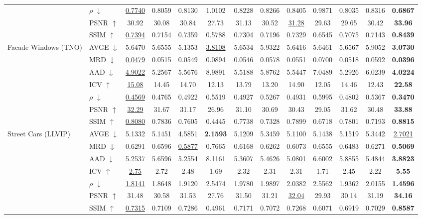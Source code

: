 \begin{table}[t]
{\begin{tabular}{llccccccccccc}
 & $\rho$ $\downarrow$ & \underline{0.7740} & 0.8059 & 0.8130 & 1.0102 & 0.8228 & 0.8266 & 0.8405 & 0.9871 & 0.8035 & 0.8316 & \textbf{0.6867} \\
 & PSNR $\uparrow$ & 30.92 & 30.08 & 30.84 & 27.73 & 31.13 & 30.52 & \underline{31.28} & 29.63 & 29.65 & 30.42 & \textbf{33.96} \\
 & SSIM $\uparrow$ & \underline{0.7394} & 0.7154 & 0.7359 & 0.5788 & 0.7304 & 0.7196 & 0.7329 & 0.6545 & 0.7075 & 0.7143 & \textbf{0.8439} \\
\midrule
\multirow{7}{*}{Facade Windows (TNO)} & AVGE $\downarrow$ & 5.6470 & 5.6555 & 5.1353 & \underline{3.8108} & 5.6534 & 5.9322 & 5.6416 & 5.6461 & 5.6567 & 5.9052 & \textbf{3.0730} \\
 & MRD $\downarrow$ & \underline{0.0479} & 0.0515 & 0.0549 & 0.0894 & 0.0546 & 0.0578 & 0.0551 & 0.0700 & 0.0518 & 0.0592 & \textbf{0.0396} \\
 & AAD $\downarrow$ & \underline{4.9022} & 5.2567 & 5.5676 & 8.9891 & 5.5188 & 5.8762 & 5.5447 & 7.0489 & 5.2926 & 6.0239 & \textbf{4.0224} \\
 & ICV $\uparrow$ & \underline{15.08} & 14.45 & 14.70 & 12.13 & 13.79 & 13.20 & 14.90 & 12.05 & 14.46 & 12.43 & \textbf{22.58} \\
 & $\rho$ $\downarrow$ & \underline{0.4569} & 0.4765 & 0.4922 & 0.5519 & 0.4927 & 0.5267 & 0.4931 & 0.5995 & 0.4802 & 0.5367 & \textbf{0.3470} \\
 & PSNR $\uparrow$ & \underline{32.29} & 31.67 & 31.17 & 26.96 & 31.10 & 30.69 & 30.43 & 29.05 & 31.62 & 30.48 & \textbf{33.88} \\
 & SSIM $\uparrow$ & \underline{0.8080} & 0.7836 & 0.7605 & 0.4445 & 0.7738 & 0.7328 & 0.7899 & 0.6718 & 0.7801 & 0.7193 & \textbf{0.8815} \\
\midrule
\multirow{7}{*}{Street Cars (LLVIP)} & AVGE $\downarrow$ & 5.1332 & 5.1451 & 4.5851 & \textbf{2.1593} & 5.1209 & 5.3459 & 5.1100 & 5.1438 & 5.1519 & 5.3442 & \underline{2.7021} \\
 & MRD $\downarrow$ & 0.6291 & 0.6596 & \underline{0.5877} & 0.7665 & 0.6168 & 0.6262 & 0.6073 & 0.6555 & 0.6483 & 0.6271 & \textbf{0.5069} \\
 & AAD $\downarrow$ & 5.2537 & 5.6596 & 5.2554 & 8.1161 & 5.3607 & 5.4626 & \underline{5.0801} & 6.6002 & 5.8855 & 5.4844 & \textbf{3.8823} \\
 & ICV $\uparrow$ & \underline{2.75} & 2.72 & 2.48 & 1.69 & 2.32 & 2.31 & 2.31 & 1.71 & 2.45 & 2.22 & \textbf{5.55} \\
 & $\rho$ $\downarrow$ & \underline{1.8141} & 1.8648 & 1.9120 & 2.5474 & 1.9780 & 1.9897 & 2.0382 & 2.5562 & 1.9362 & 2.0155 & \textbf{1.4596} \\
 & PSNR $\uparrow$ & 31.48 & 30.58 & 31.53 & 27.76 & 31.50 & 31.21 & \underline{32.04} & 29.93 & 30.14 & 31.19 & \textbf{34.16} \\
 & SSIM $\uparrow$ & \underline{0.7315} & 0.7109 & 0.7286 & 0.4961 & 0.7171 & 0.7072 & 0.7268 & 0.6071 & 0.6919 & 0.7029 & \textbf{0.8587} \\
\bottomrule
\end{tabular}
}
\end{table}